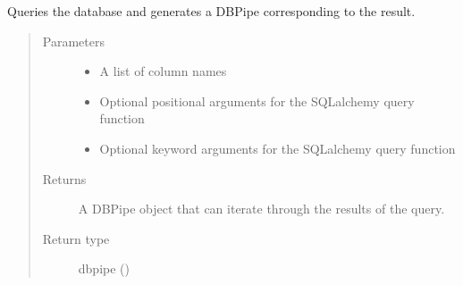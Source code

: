 \documentclass[letterpaper,10pt,english]{sphinxmanual}
\begin{document}
\begin{fulllineitems}
\begin{fulllineitems}
\begin{quote}
\begin{description}
\end{description}\end{quote}

\end{fulllineitems}


\begin{fulllineitems}
\label{\detokenize{Fireworks:Fireworks.extensions.database.TablePipe.query}}
Queries the database and generates a DBPipe corresponding to the result.
\begin{quote}\begin{description}
\item[{Parameters}] \leavevmode\begin{itemize}
\item {} 
 \textendash{} A list of column names

\item {} 
 \textendash{} Optional positional arguments for the SQLalchemy query function

\item {} 
 \textendash{} Optional keyword arguments for the SQLalchemy query function

\end{itemize}

\item[{Returns}] \leavevmode
A DBPipe object that can iterate through the results of the query.

\item[{Return type}] \leavevmode
dbpipe ({\hyperref[\detokenize{Fireworks:Fireworks.extensions.database.DBPipe}]{}})

\end{description}\end{quote}

\end{fulllineitems}


\begin{fulllineitems}
\label{\detokenize{Fireworks:Fireworks.extensions.database.TablePipe.delete}}
\end{fulllineitems}


\end{fulllineitems}
\end{document}
